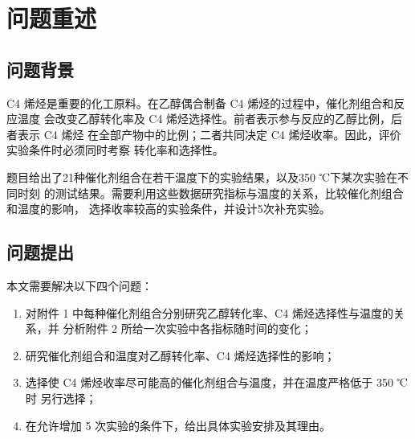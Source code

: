 \section{问题重述}\label{sec:restatement}

\subsection{问题背景}

C4 烯烃是重要的化工原料。在乙醇偶合制备 C4 烯烃的过程中，催化剂组合和反应温度
会改变乙醇转化率及 C4 烯烃选择性。前者表示参与反应的乙醇比例，后者表示 C4 烯烃
在全部产物中的比例；二者共同决定 C4 烯烃收率。因此，评价实验条件时必须同时考察
转化率和选择性。

题目给出了21种催化剂组合在若干温度下的实验结果，以及350 ℃下某次实验在不同时刻
的测试结果。需要利用这些数据研究指标与温度的关系，比较催化剂组合和温度的影响，
选择收率较高的实验条件，并设计5次补充实验。

\subsection{问题提出}

本文需要解决以下四个问题：

\begin{enumerate}
\def\labelenumi{\arabic{enumi}.}
\tightlist
\item
  对附件 1 中每种催化剂组合分别研究乙醇转化率、C4 烯烃选择性与温度的关系，并
  分析附件 2 所给一次实验中各指标随时间的变化；
\item
  研究催化剂组合和温度对乙醇转化率、C4 烯烃选择性的影响；
\item
  选择使 C4 烯烃收率尽可能高的催化剂组合与温度，并在温度严格低于 350 ℃ 时
  另行选择；
\item
  在允许增加 5 次实验的条件下，给出具体实验安排及其理由。
\end{enumerate}
